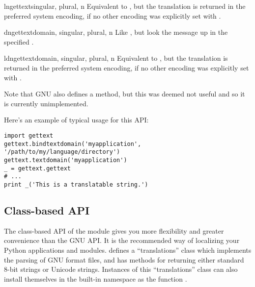 \begin{funcdesc}{lngettext}{singular, plural, n}
Equivalent to , but the translation is returned
in the preferred system encoding, if no other encoding was explicitly
set with .

\end{funcdesc}

\begin{funcdesc}{dngettext}{domain, singular, plural, n}
Like , but look the message up in the specified
.

\end{funcdesc}

\begin{funcdesc}{ldngettext}{domain, singular, plural, n}
Equivalent to , but the translation is returned
in the preferred system encoding, if no other encoding was explicitly
set with .

\end{funcdesc}



Note that GNU  also defines a 
method, but this was deemed not useful and so it is currently
unimplemented.

Here's an example of typical usage for this API:

\begin{verbatim}
import gettext
gettext.bindtextdomain('myapplication', '/path/to/my/language/directory')
gettext.textdomain('myapplication')
_ = gettext.gettext
# ...
print _('This is a translatable string.')
\end{verbatim}

\subsection{Class-based API}

The class-based API of the  module gives you more
flexibility and greater convenience than the GNU 
API.  It is the recommended way of localizing your Python applications and
modules.   defines a ``translations'' class which
implements the parsing of GNU  format files, and has methods
for returning either standard 8-bit strings or Unicode strings.
Instances of this ``translations'' class can also install themselves 
in the built-in namespace as the function \function{_()}.

